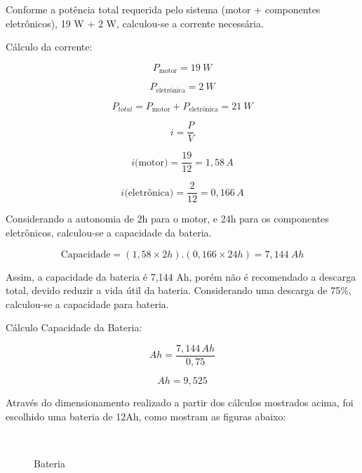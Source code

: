 Conforme a potência total requerida pelo sistema (motor + componentes eletrônicos), 19 W + 2 W, calculou-se a corrente necessária.

Cálculo da corrente:

\begin{equation}
P_\text{motor}=19~W
\end{equation}

\begin{equation}
P_\text{eletrônica}=2~W
\end{equation}

\begin{equation}
P_{total}=P_\text{motor}+P_\text{eletrônica}=21~W
\end{equation}

\begin{equation}
i=\frac{P}{V}
\end{equation}

\begin{equation}
i\text{(motor)}=\frac{19}{12} = 1,58\,A
\end{equation}

\begin{equation}
i\text{(eletrônica)}=\frac{2}{12} = 0,166\,A
\end{equation}

Considerando a autonomia de 2h para o motor, e 24h para os componentes eletrônicos, calculou-se a capacidade da bateria.

\begin{equation}
\text{Capacidade}=(1,58\times2h).(0,166\times24h)=7,144~Ah
\end{equation}

Assim, a capacidade da bateria é 7,144 Ah, porém não é recomendado a descarga total, devido reduzir a vida útil da bateria. Considerando uma descarga de 75\%, calculou-se a capacidade para bateria.

Cálculo Capacidade da Bateria:

\begin{equation}
Ah=\frac{7,144\,Ah}{0,75}
\end{equation}

\begin{equation}
Ah=9,525
\end{equation}

Através do dimensionamento realizado a partir dos cálculos mostrados acima, foi escolhido uma bateria de 12Ah, como mostram as figuras abaixo:

\begin{figure}[!ht]
\centering
    \qquad
    \\

   \caption{Bateria}
\label{figuras1}
\end{figure}


